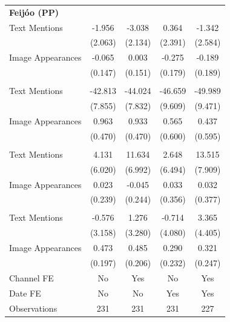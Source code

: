 \documentclass[12pt]{article}
\begin{document}
\begin{table}[htbp!]
\begin{tabular}{lcccc}
		\multicolumn{5}{l}{\textbf{Feijóo (PP)}}\\
		Text Mentions     &  -1.956         &  -3.038         &   0.364         &   -1.342        \\
		&  (2.063)        &  (2.134)        &  (2.391)        &  (2.584)        \\
		Image Appearances &  -0.065         &   0.003         &  -0.275         &  -0.189         \\
		&  (0.147)        &  (0.151)        &  (0.179)        &  (0.189)        \\
		\addlinespace
		\hline
		\multicolumn{5}{l}{\textbf{Abascal (VOX)}}\\
		Text Mentions     & -42.813& -44.024& -46.659& -49.989\\
		&  (7.855)        &  (7.832)        &  (9.609)        &  (9.471)        \\
		Image Appearances &   0.963 &   0.933&   0.565         &   0.437         \\
		&  (0.470)        &  (0.470)        &  (0.600)        &  (0.595)        \\
		\addlinespace
		\hline
		\multicolumn{5}{l}{\textbf{Sánchez (PSOE)}}\\
		Text Mentions     &   4.131         &  11.634 &   2.648         &  13.515  \\
		&  (6.020)        &  (6.992)        &  (6.494)        &  (7.909)        \\
		Image Appearances &   0.023         &  -0.045         &   0.033         &   0.032         \\
		&  (0.239)        &  (0.244)        &  (0.356)        &  (0.377)        \\
		\addlinespace
		\hline
		\multicolumn{5}{l}{\textbf{Díaz (UP)}}\\
		Text Mentions     &  -0.576         &   1.276         &  -0.714         &   3.365         \\
		&  (3.158)        &  (3.280)        &  (4.080)        &  (4.405)        \\
		Image Appearances &   0.473&   0.485 &   0.290         &   0.321         \\
		&  (0.197)        &  (0.206)        &  (0.232)        &  (0.247)        \\
		\midrule
		Channel FE        & No              & Yes             & No              & Yes             \\
		Date FE           & No              & No              & Yes             & Yes             \\
		\midrule
		Observations      & 231             & 231             & 231             & 227             \\
		\bottomrule
	\end{tabular}
	

\end{table}
\end{document}
